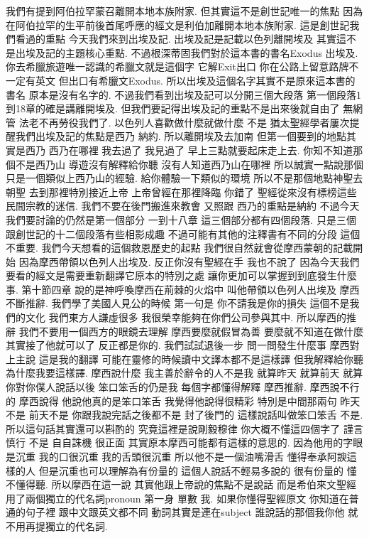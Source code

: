 \documentclass{book}
\begin{document}
我們有提到阿伯拉罕蒙召離開本地本族附家.
但其實這不是創世記唯一的焦點 因為在阿伯拉罕的生平前後首尾呼應的經文是利伯加離開本地本族附家.
這是創世記我們看過的重點 今天我們來到出埃及記.
出埃及記是記載以色列離開埃及 其實這不是出埃及記的主題核心重點.
不過根深蒂固我們對於這本書的書名Exodus 出埃及.
你去希臘旅遊唯一認識的希臘文就是這個字 它解Exit出口 你在公路上留意路牌不一定有英文 但出口有希臘文Exodus.
所以出埃及這個名字其實不是原來這本書的書名 原本是沒有名字的.
不過我們看到出埃及記可以分開三個大段落 第一個段落1到18章的確是講離開埃及.
但我們要記得出埃及記的重點不是出來後就自由了 無網管 法老不再勞役我們了.
以色列人喜歡做什麼就做什麼 不是 猶太聖經學者屢次提醒我們出埃及記的焦點是西乃 納約.
所以離開埃及去加南 但第一個要到的地點其實是西乃 西乃在哪裡 我去過了 我見過了 早上三點就要起床走上去.
你知不知道那個不是西乃山 導遊沒有解釋給你聽 沒有人知道西乃山在哪裡 所以誠實一點說那個只是一個類似上西乃山的經驗.
給你體驗一下類似的環境 所以不是那個地點神聖去朝聖 去到那裡特別接近上帝 上帝曾經在那裡降臨 你錯了 聖經從來沒有標榜這些民間宗教的迷信.
我們不要在後門搬進來教會 又照跟 西乃的重點是納約 不過今天我們要討論的仍然是第一個部分 一到十八章 這三個部分都有四個段落.
只是三個 跟創世記的十二個段落有些相影成趣 不過可能有其他的注釋書有不同的分段 這個不重要.
我們今天想看的這個救恩歷史的起點 我們很自然就會從摩西蒙朝的記載開始 因為摩西帶領以色列人出埃及.
反正你沒有聖經在手 我也不說了 因為今天我們要看的經文是需要重新翻譯它原本的特別之處 讓你更加可以掌握到到底發生什麼事.
第十節四章 說的是神呼喚摩西在荊棘的火焰中 叫他帶領以色列人出埃及 摩西不斷推辭.
我們學了美國人見公的時候 第一句是 你不請我是你的損失 這個不是我們的文化 我們東方人謙虛很多 我很榮幸能夠在你們公司參與其中.
所以摩西的推辭 我們不要用一個西方的眼鏡去理解 摩西要麼就假冒為善 要麼就不知道在做什麼 其實接了他就可以了 反正都是你的.
我們試試退後一步 問一問發生什麼事 摩西對上主說 這是我的翻譯 可能在靈修的時候讀中文譯本都不是這樣譯 但我解釋給你聽為什麼我要這樣譯.
摩西說什麼 我主善於辭令的人不是我 就算昨天 就算前天 就算你對你僕人說話以後 笨口笨舌的仍是我 每個字都懂得解釋 摩西推辭.
摩西說不行的 摩西說得 他說他真的是笨口笨舌 我覺得他說得很精彩 特別是中間那兩句 昨天不是 前天不是 你跟我說完話之後都不是 封了後門的 這樣說話叫做笨口笨舌 不是.
所以這句話其實還可以斟酌的 究竟這裡是說剛毅穆律 你大概不懂這四個字了 謹言慎行 不是 自自誅機 很正面 其實原本摩西可能都有這樣的意思的.
因為他用的字眼是沉重 我的口很沉重 我的舌頭很沉重 所以他不是一個油嘴滑舌 懂得奉承阿諛這樣的人 但是沉重也可以理解為有份量的 這個人說話不輕易多說的 很有份量的 懂不懂得聽.
所以摩西在這一說 其實他跟上帝說的焦點不是說話 而是希伯來文聖經用了兩個獨立的代名詞pronoun 第一身 單數 我.
如果你懂得聖經原文 你知道在普通的句子裡 跟中文跟英文都不同 動詞其實是連在subject 誰說話的那個我你他 就不用再提獨立的代名詞.
\end{document}
